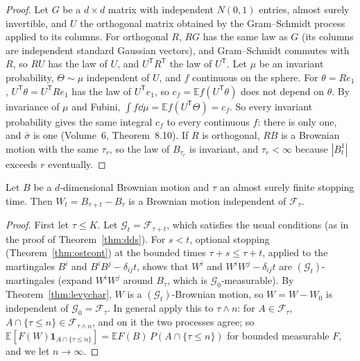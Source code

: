 \begin{proof}
Let $G$ be a $d\times d$ matrix with independent $N(0,1)$ entries, almost surely invertible, and $U$ the orthogonal matrix obtained by the Gram--Schmidt process applied to its columns. For orthogonal $R$, $RG$ has the same
law as $G$ (its columns are independent standard Gaussian vectors), and Gram--Schmidt commutes with $R$, so $RU$ has the law of $U$, and $U^{\mathsf T}R^{\mathsf T}$ the law of $U^{\mathsf T}$. Let $\mu$ be an invariant
probability, $\Theta\sim\mu$ independent of $U$, and $f$ continuous on the sphere. For $\theta=Re_1$, $U^{\mathsf T}\theta=U^{\mathsf T}Re_1$ has the law of $U^{\mathsf T}e_1$, so $c_f=\mathbb Ef(U^{\mathsf T}\theta)$ does not depend on $\theta$.
By invariance of $\mu$ and Fubini, $\int f\dd\mu=\mathbb Ef(U^{\mathsf T}\Theta)=c_f$. So every invariant probability gives the same integral $c_f$ to every continuous $f$: there is only one, and $\bar\sigma$ is one (Volume~6,
Theorem~8.10). If $R$ is orthogonal, $RB$ is a Brownian motion with the same $\tau_r$, so the law of $B_{\tau_r}$ is invariant, and $\tau_r<\infty$ because $|B^1_t|$ exceeds $r$ eventually.
\end{proof}

\begin{proposition}\label{prop:strongmarkovd}
Let $B$ be a $d$-dimensional Brownian motion and $\tau$ an almost surely finite stopping time. Then $W_t=B_{\tau+t}-B_\tau$ is a Brownian motion independent of $\mathcal F_\tau$.
\end{proposition}

\begin{proof}
First let $\tau\le K$. Let $\mathcal G_t=\mathcal F_{\tau+t}$, which satisfies the usual conditions (as in the proof of Theorem~\ref{thm:dds}). For $s<t$, optional stopping (Theorem~\ref{thm:ostcont}) at the bounded times
$\tau+s\le\tau+t$, applied to the martingales $B^i$ and $B^iB^j-\delta_{ij}t$, shows that $W^i$ and $W^iW^j-\delta_{ij}t$ are $(\mathcal G_t)$-martingales (expand $W^iW^j$ around $B_\tau$, which is
$\mathcal G_0$-measurable). By Theorem~\ref{thm:levychar}, $W$ is a $(\mathcal G_t)$-Brownian motion, so $W=W-W_0$ is independent of $\mathcal G_0=\mathcal F_\tau$. In general apply this to $\tau\wedge n$: for $A\in\mathcal F_\tau$,
$A\cap\{\tau\le n\}\in\mathcal F_{\tau\wedge n}$, and on it the two processes agree; so $\mathbb E[F(W)\mathbf 1_{A\cap\{\tau\le n\}}]=\mathbb EF(B)\,P(A\cap\{\tau\le n\})$ for bounded measurable $F$, and we let $n\to\infty$.
\end{proof}


